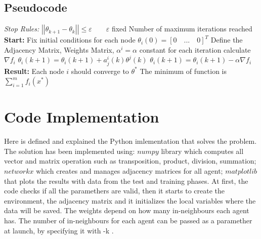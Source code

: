 \documentclass[a4paper,11pt,oneside]{book}
\begin{document}
\subsection {Pseudocode} \label{Subsec1.1.3}
\begin{algorithm}
\caption{}
\begin{algorithmic} [1]
\State \textit{Stop Rules:}
\State $\left|\left|\theta_{k+1} - \theta_k\right|\right|  \leq \varepsilon \qquad \varepsilon$ fixed
\State Number of maximum iterations reached
\State \textbf{Start:}
\State Fix initial conditions for each node $\theta_i(0) = [0 \quad ... \quad 0]^T$
\State Define the Adjacency Matrix, Weights Matrix, $\alpha^i = \alpha$ constant for each iteration
    \State calculate $\nabla f_i$
        \State $\theta_i(k+1) = \theta_i(k+1) + a^i_j(k) \theta^j(k)$
    \EndFor
    \State $\theta_i(k+1) = \theta_i(k+1) - \alpha \nabla f_i$
\EndWhile
\State \textbf{Result:}
\State Each node $i$ should converge to $\theta^*$
\State The minimum of function is $\sum \limits_{i=1}^{m}f_i(x^*)$
\end{algorithmic}
\end{algorithm}


\section {Code Implementation} \label{Sec1.2}

Here is defined and explained the Python imlementation that solves the problem. The solution has been
implemented using: $numpy$ library which computes all vector and matrix operation such as transposition, product, division,
summation; $networkx$ which creates and manages adjacency matrices for all agent; $matplotlib$ that plots the results
with data from the test and training phases. At first, the code checks if all the paramethers are valid,
then it starts to create the environment, the adjacency matrix and it initializes the local variables where
the data will be saved. The weights depend on how many in-neighbours each agent has. The number of in-neighbours for each agent can be passed as a paramether at launch, by specifying it with -k . \\
\end{document}
